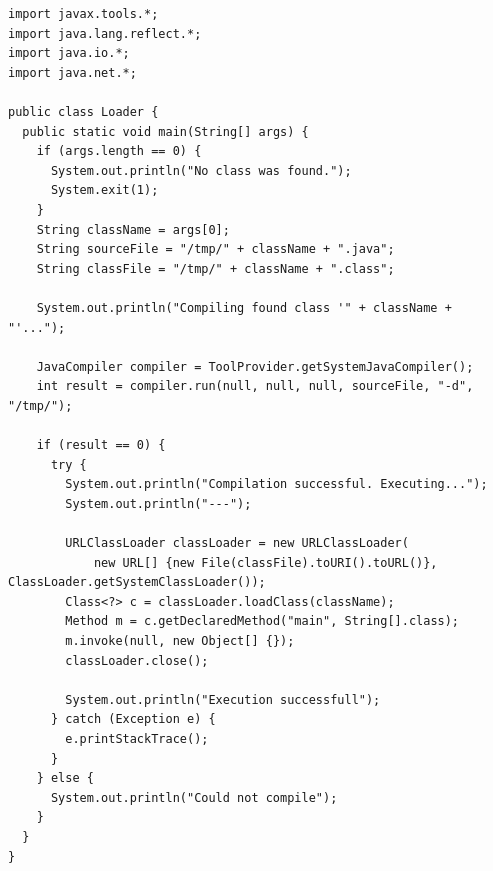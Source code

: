 \begin{minipage}{\linewidth}
\begin{lstlisting}
import javax.tools.*;
import java.lang.reflect.*;
import java.io.*;
import java.net.*;

public class Loader {
  public static void main(String[] args) {
    if (args.length == 0) {
      System.out.println("No class was found.");
      System.exit(1);
    }
    String className = args[0];
    String sourceFile = "/tmp/" + className + ".java";
    String classFile = "/tmp/" + className + ".class";

    System.out.println("Compiling found class '" + className + "'...");

    JavaCompiler compiler = ToolProvider.getSystemJavaCompiler();
    int result = compiler.run(null, null, null, sourceFile, "-d", "/tmp/");

    if (result == 0) {
      try {
        System.out.println("Compilation successful. Executing...");
        System.out.println("---");

        URLClassLoader classLoader = new URLClassLoader(
            new URL[] {new File(classFile).toURI().toURL()}, ClassLoader.getSystemClassLoader());
        Class<?> c = classLoader.loadClass(className);
        Method m = c.getDeclaredMethod("main", String[].class);
        m.invoke(null, new Object[] {});
        classLoader.close();

        System.out.println("Execution successfull");
      } catch (Exception e) {
        e.printStackTrace();
      }
    } else {
      System.out.println("Could not compile");
    }
  }
}
\end{lstlisting}
\end{minipage}